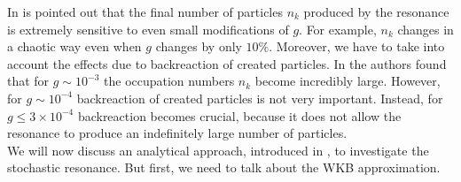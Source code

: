 \documentclass[11pt,a4paper,twoside]{book}
\begin{document}
 In \cite{Chap4:LindePreheatingModel} is pointed out that the final number of particles $ n_{k} $ produced by the resonance is extremely sensitive to even small modifications of $ g $. For example, $ n_{k} $ changes in a chaotic way even when $ g $ changes by only $ 10\% $. Moreover, we have to take into account the effects due to backreaction of created particles. In \cite{Chap4:LindePreheatingModel} the authors found that for $ g \sim 10^{-3} $ the occupation numbers $ n_{k} $ become incredibly large. However, for $ g \sim 10^{-4} $ backreaction of created particles is not very important. Instead, for $ g \le 3 \times 10^{-4} $ backreaction becomes crucial, because it does not allow the resonance to produce an indefinitely large number of particles.\\
We will now discuss an analytical approach, introduced in \cite{Chap4:LindePreheatingModel}, to investigate the stochastic resonance. But first, we need to talk about the WKB approximation.
\end{document}
